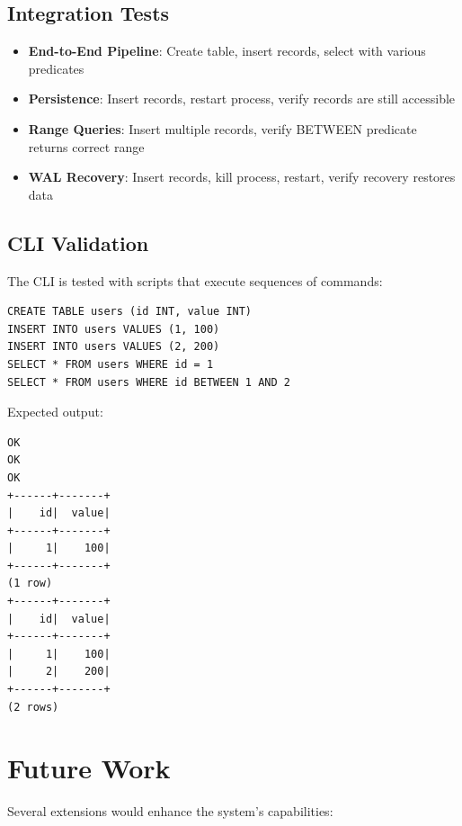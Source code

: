 \documentclass{article}
\begin{document}
\subsection{Integration Tests}

\begin{itemize}
    \item \textbf{End-to-End Pipeline}: Create table, insert records, select with various predicates
    \item \textbf{Persistence}: Insert records, restart process, verify records are still accessible
    \item \textbf{Range Queries}: Insert multiple records, verify BETWEEN predicate returns correct range
    \item \textbf{WAL Recovery}: Insert records, kill process, restart, verify recovery restores data
\end{itemize}

\subsection{CLI Validation}

The CLI is tested with scripts that execute sequences of commands:
\begin{verbatim}
CREATE TABLE users (id INT, value INT)
INSERT INTO users VALUES (1, 100)
INSERT INTO users VALUES (2, 200)
SELECT * FROM users WHERE id = 1
SELECT * FROM users WHERE id BETWEEN 1 AND 2
\end{verbatim}

Expected output:
\begin{verbatim}
OK
OK
OK
+------+-------+
|    id|  value|
+------+-------+
|     1|    100|
+------+-------+
(1 row)
+------+-------+
|    id|  value|
+------+-------+
|     1|    100|
|     2|    200|
+------+-------+
(2 rows)
\end{verbatim}

\section{Future Work}

Several extensions would enhance the system's capabilities:
\end{document}
